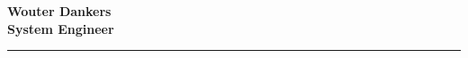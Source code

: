 \Huge\bfseries {\color{RoyalBlue} Wouter Dankers} \\
\Large\bfseries  System Engineer \\
\textcolor{RoyalBlue}{\rule{\textwidth}{\lineTickness}}
\SmallSep
